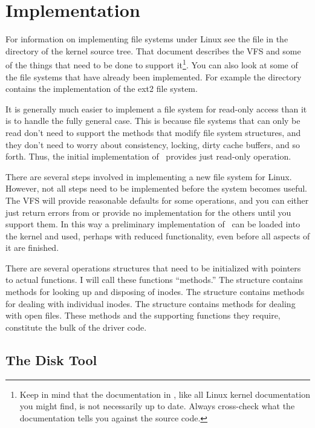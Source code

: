 
\section{Implementation}
\label{sec:implementation}

For information on implementing file systems under Linux see the file  in the
 directory of the kernel source tree. That document
describes the VFS and some of the things that need to be done to support it\footnote{Keep in
  mind that the documentation in , like all Linux kernel documentation
  you might find, is not necessarily up to date. Always cross-check what the documentation tells
  you against the source code.}. You can also look at some of the file systems that have already
been implemented. For example the directory  contains the implementation of
the ext2 file system.

It is generally much easier to implement a file system for read-only access than it is to handle
the fully general case. This is because file systems that can only be read don't need to support
the methods that modify file system structures, and they don't need to worry about consistency,
locking, dirty cache buffers, and so forth. Thus, the initial implementation of \GenericFS\
provides just read-only operation.

There are several steps involved in implementing a new file system for Linux. However, not all
steps need to be implemented before the system becomes useful. The VFS will provide reasonable
defaults for some operations, and you can either just return errors from or provide no
implementation for the others until you support them. In this way a preliminary implementation
of \GenericFS\ can be loaded into the kernel and used, perhaps with reduced functionality, even
before all aspects of it are finished.

There are several operations structures that need to be initialized with pointers to actual
functions. I will call these functions ``methods.'' The \code{super_block} structure contains
methods for looking up and disposing of inodes. The \code{inode_operations} structure contains
methods for dealing with individual inodes. The \code{file_operations} structure contains
methods for dealing with open files. These methods and the supporting functions they require,
constitute the bulk of the driver code.

\subsection{The Disk Tool}
\label{sec:implementation-disktool}

